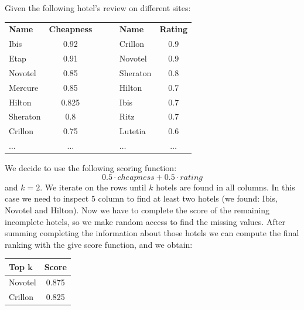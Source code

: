 \documentclass[12pt, a4paper]{report}
\newtheorem[style=M,bodystyle=\normalfont]{theorem}{Theorem}
\newtheorem[style=M,bodystyle=\normalfont]{corollary}{Corollary}
\newtheorem[style=M,bodystyle=\normalfont]{lemma}{Lemma}
\newtheorem[style=M,bodystyle=\normalfont]{definition}{Definition}
\begin{document}
    \begin{example}
        Given the following hotel's review on different sites: 
        \begin{table}[H]
            \centering
            \begin{tabular}{|lc|c|lc|}
            \cline{1-2} \cline{4-5}
            \textbf{Name} & \textbf{Cheapness} & $\:\:\:\:\:\:$ & \textbf{Name} & \textbf{Rating} \\ \cline{1-2} \cline{4-5} 
            Ibis          & 0.92               &                & Crillon       & 0.9             \\ 
            Etap          & 0.91               &                & Novotel       & 0.9             \\  
            Novotel       & 0.85               &                & Sheraton      & 0.8             \\  
            Mercure       & 0.85               &                & Hilton        & 0.7             \\  
            Hilton        & 0.825              &                & Ibis          & 0.7             \\  
            Sheraton      & 0.8                &                & Ritz          & 0.7             \\  
            Crillon       & 0.75               &                & Lutetia       & 0.6             \\  
            $\dots$       & $\dots$            &                & $\dots$       & $\dots$         \\ \cline{1-2} \cline{4-5} 
            \end{tabular}
        \end{table}
        We decide to use the following scoring function: 
        \[0.5 \cdot cheapness+0.5 \cdot rating\]
        and $k=2$. We iterate on the rows until $k$ hotels are found in all columns. In this case we need to inspect $5$ column to find at
        least two hotels (we found: Ibis, Novotel and Hilton). Now we have to complete the score of the remaining incomplete hotels, so we make 
        random access to find the missing values. After summing completing the information about those hotels we can compute the final ranking 
        with the give score function, and we obtain: 
        \begin{table}[H]
            \centering
            \begin{tabular}{|lc|}
            \hline
            \textbf{Top $\boldsymbol{k}$} & \textbf{Score} \\ \hline
            Novotel                       & 0.875          \\ 
            Crillon                       & 0.825          \\ \hline
            \end{tabular}
        \end{table}
    \end{example}
\end{document}
